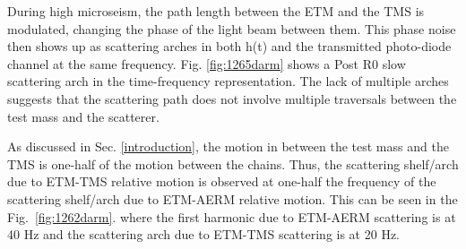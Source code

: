 \documentclass[12pt]{iopart}
\begin{document}
During high microseism, the path length between the ETM and the TMS is modulated, changing the phase of the light beam between them. This phase noise then shows up as scattering arches in both h(t) and the transmitted photo-diode channel at the same frequency. Fig. \ref{fig:1265darm} shows a Post R0 slow scattering arch in the time-frequency representation. The lack of multiple arches suggests that the scattering  path does not involve multiple traversals between the test mass and the scatterer.


As discussed in Sec. \ref{introduction}, the motion in between the test mass and the TMS is one-half of the motion between the chains.
Thus, the scattering shelf/arch due to ETM-TMS relative motion is observed at one-half the frequency of the scattering shelf/arch due to ETM-AERM relative motion. This can be seen in the Fig.~\ref{fig:1262darm}. where the first harmonic due to ETM-AERM scattering is at 40 Hz and the scattering arch due to ETM-TMS scattering is at 20 Hz.
\end{document}

